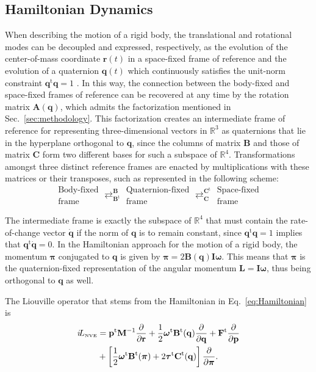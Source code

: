 \documentclass[journal=jctcce,manuscript=article,layout=twocolumn]{achemso}
\newcommand{\mt}[1]{\boldsymbol{\mathbf{#1}}}   %
\newcommand{\vt}[1]{\boldsymbol{\mathbf{#1}}}   %
\newcommand{\tr}[1]{#1^\text{t}}                %
\newcommand{\diff}[2]{\frac{\partial #1}{\partial #2}} %
\newcommand{\Liu}[1]{i\!L_\text{#1}}            %
\begin{document}
\subsection{Hamiltonian Dynamics}
\label{eq:hamiltonian dynamics}

When describing the motion of a rigid body, the translational and rotational modes can be decoupled and expressed, respectively, as the evolution of the center-of-mass coordinate $\vt r(t)$ in a space-fixed frame of reference and the evolution of a quaternion $\vt q(t)$ which continuously satisfies the unit-norm constraint $\tr{\vt q}{\vt q} = 1$ \cite{Goldstein_2002}. In this way, the connection between the body-fixed and space-fixed frames of reference can be recovered at any time by the rotation matrix $\mt A(\vt q)$, which admits the factorization mentioned in Sec.~\ref{sec:methodology}. This factorization creates an intermediate frame of reference for representing three-dimensional vectors in $\mathbb{R}^3$ as quaternions that lie in the hyperplane orthogonal to $\vt q$, since the columns of matrix $\mt B$ and those of matrix $\mt C$ form two different bases for such a subspace of $\mathbb{R}^4$. Transformations amongst three distinct reference frames are enacted by multiplications with these matrices or their transposes, such as represented in the following scheme:
\begin{equation*}
\boxed{\substack{\text{Body-fixed} \\ \text{frame}}}
\mathrel{\mathop{\rightleftarrows}^{\mt B}_{\tr{\mt B}}}
\boxed{\substack{\text{Quaternion-fixed} \\ \text{frame}}}
\mathrel{\mathop{\rightleftarrows}^{\tr{\mt C}}_{\mt C}}
\boxed{\substack{\text{Space-fixed} \\ \text{frame}}}
\end{equation*}

The intermediate frame is exactly the subspace of $\mathbb{R}^4$ that must contain the rate-of-change vector $\dot{\vt q}$ if the norm of $\vt q$ is to remain constant, since $\tr{\vt q} {\vt q} = 1$ implies that $\tr{\vt q} \dot{\vt q} = 0$. In the Hamiltonian approach for the motion of a rigid body, the momentum $\vt \pi$ conjugated to $\vt q$ is given by $\vt \pi = 2 \mt B(\vt q) \mt I \vt \omega$.\cite{Silveira_2017} This means that $\vt \pi$ is the quaternion-fixed representation of the angular momentum $\vt L = \mt I \vt \omega$, thus being orthogonal to $\vt q$ as well.

The Liouville operator that stems from the Hamiltonian in Eq.~\eqref{eq:Hamiltonian} is\cite{Silveira_2017}
\begin{equation}
\label{eq:Lioville operator}
\begin{split}
\Liu{\tiny NVE} &= \tr{\vt p} {\mt M}^{-1} \diff{}{\vt r} + \frac{1}{2} \tr{\vt \omega} \tr{\mt B}(\vt q) \diff{}{\vt q} + \tr{\vt F} \diff{}{\vt p} \\
&+ \left[ \frac{1}{2} \tr{\vt \omega} \tr{\mt B}(\vt \pi) + 2 \tr{\vt \tau} \tr{\mt C}(\vt q) \right] \diff{}{\vt \pi}.
\end{split}
\end{equation}
\end{document}
